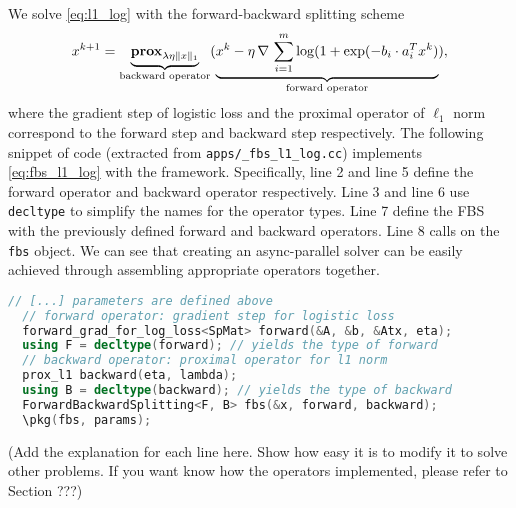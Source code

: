 We solve \eqref{eq:l1_log} with the forward-backward splitting scheme
\begin{equation}\label{eq:fbs_l1_log}
x^{k+1} = \underbrace{\mathbf{prox}_{\lambda \eta \|x\|_1}}_{\text{backward operator}} (\underbrace{x^k - \eta \, \nabla \,\sum_{i = 1}^m \log (1 + \exp(-b_i \cdot a_i^T x^k)}_{\text{forward operator}}),
\end{equation}  
where the gradient step of logistic loss and the proximal operator of $\ell_1$ norm correspond to the forward step and backward step respectively. The following snippet of code (extracted from \texttt{apps/\pkg\_fbs\_l1\_log.cc}) implements \eqref{eq:fbs_l1_log} with the \pkg framework. Specifically, line 2 and line 5 define the forward operator and backward operator respectively. Line 3 and line 6 use \texttt{decltype} to simplify the names for the operator types. Line 7 define the FBS with the previously defined forward and backward operators. Line 8 calls \texttt{\pkg} on the \texttt{fbs}  object. We can see that creating an async-parallel solver can be easily achieved through assembling appropriate operators together.  
\begin{lstlisting}[language=C++]
  // [...] parameters are defined above
  // forward operator: gradient step for logistic loss
  forward_grad_for_log_loss<SpMat> forward(&A, &b, &Atx, eta);
  using F = decltype(forward); // yields the type of forward
  // backward operator: proximal operator for l1 norm 
  prox_l1 backward(eta, lambda);
  using B = decltype(backward); // yields the type of backward
  ForwardBackwardSplitting<F, B> fbs(&x, forward, backward);  
  \pkg(fbs, params);  
\end{lstlisting}

(Add the explanation for each line here. Show how easy it is to modify it to solve other problems. If you want know how the operators implemented, please refer to Section ???)
